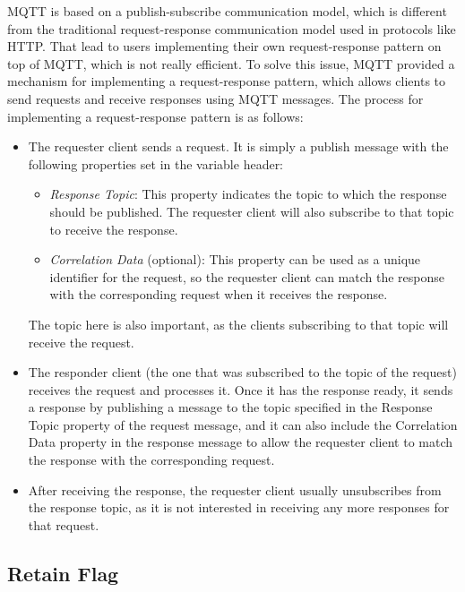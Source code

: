 MQTT is based on a publish-subscribe communication model, which is different from the traditional request-response communication model used in protocols like HTTP. That lead to users implementing their own request-response pattern on top of MQTT, which is not really efficient. To solve this issue, MQTT provided a mechanism for implementing a request-response pattern, which allows clients to send requests and receive responses using MQTT messages. The process for implementing a request-response pattern is as follows:
\begin{itemize}
    \item The requester client sends a request. It is simply a publish message with the following properties set in the variable header:
    \begin{itemize}
        \item \emph{Response Topic}: This property indicates the topic to which the response should be published. The requester client will also subscribe to that topic to receive the response.
        \item \emph{Correlation Data} (optional): This property can be used as a unique identifier for the request, so the requester client can match the response with the corresponding request when it receives the response.
    \end{itemize}
    The topic here is also important, as the clients subscribing to that topic will receive the request.
    \item The responder client (the one that was subscribed to the topic of the request) receives the request and processes it. Once it has the response ready, it sends a response by publishing a message to the topic specified in the Response Topic property of the request message, and it can also include the Correlation Data property in the response message to allow the requester client to match the response with the corresponding request.
    \item After receiving the response, the requester client usually unsubscribes from the response topic, as it is not interested in receiving any more responses for that request.
\end{itemize}

\subsection{Retain Flag}

